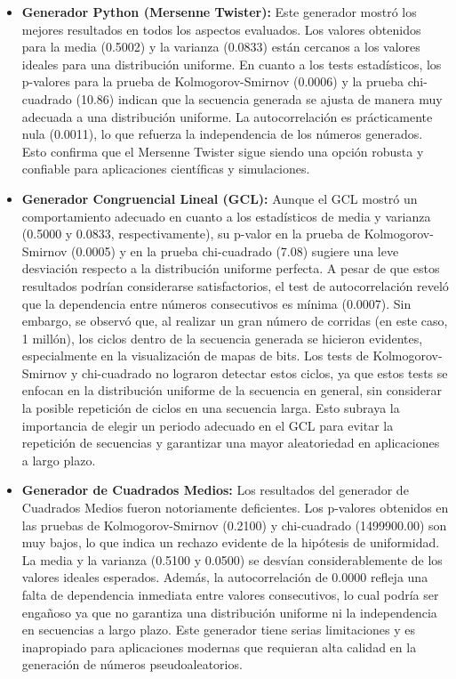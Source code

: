 \documentclass{article}
\begin{document}
\begin{itemize} 
    \item \textbf{Generador Python (Mersenne Twister):} Este generador mostró los mejores resultados en todos los aspectos evaluados. Los valores obtenidos para la media (0.5002) y la varianza (0.0833) están cercanos a los valores ideales para una distribución uniforme. En cuanto a los tests estadísticos, los p-valores para la prueba de Kolmogorov-Smirnov (0.0006) y la prueba chi-cuadrado (10.86) indican que la secuencia generada se ajusta de manera muy adecuada a una distribución uniforme. La autocorrelación es prácticamente nula (0.0011), lo que refuerza la independencia de los números generados. Esto confirma que el Mersenne Twister sigue siendo una opción robusta y confiable para aplicaciones científicas y simulaciones.

    \item \textbf{Generador Congruencial Lineal (GCL):} Aunque el GCL mostró un comportamiento adecuado en cuanto a los estadísticos de media y varianza (0.5000 y 0.0833, respectivamente), su p-valor en la prueba de Kolmogorov-Smirnov (0.0005) y en la prueba chi-cuadrado (7.08) sugiere una leve desviación respecto a la distribución uniforme perfecta. A pesar de que estos resultados podrían considerarse satisfactorios, el test de autocorrelación reveló que la dependencia entre números consecutivos es mínima (0.0007). Sin embargo, se observó que, al realizar un gran número de corridas (en este caso, 1 millón), los ciclos dentro de la secuencia generada se hicieron evidentes, especialmente en la visualización de mapas de bits. Los tests de Kolmogorov-Smirnov y chi-cuadrado no lograron detectar estos ciclos, ya que estos tests se enfocan en la distribución uniforme de la secuencia en general, sin considerar la posible repetición de ciclos en una secuencia larga. Esto subraya la importancia de elegir un periodo adecuado en el GCL para evitar la repetición de secuencias y garantizar una mayor aleatoriedad en aplicaciones a largo plazo.

    \item \textbf{Generador de Cuadrados Medios:} Los resultados del generador de Cuadrados Medios fueron notoriamente deficientes. Los p-valores obtenidos en las pruebas de Kolmogorov-Smirnov (0.2100) y chi-cuadrado (1499900.00) son muy bajos, lo que indica un rechazo evidente de la hipótesis de uniformidad. La media y la varianza (0.5100 y 0.0500) se desvían considerablemente de los valores ideales esperados. Además, la autocorrelación de 0.0000 refleja una falta de dependencia inmediata entre valores consecutivos, lo cual podría ser engañoso ya que no garantiza una distribución uniforme ni la independencia en secuencias a largo plazo. Este generador tiene serias limitaciones y es inapropiado para aplicaciones modernas que requieran alta calidad en la generación de números pseudoaleatorios.
\end{itemize}
\end{document}
